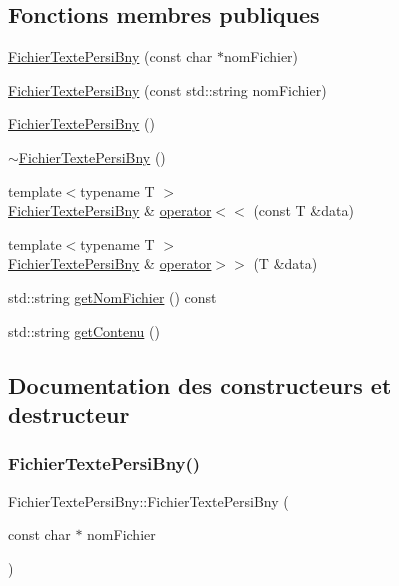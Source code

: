 \subsection*{Fonctions membres publiques}
\begin{DoxyCompactItemize}
\item 
\hyperlink{classFichierTextePersiBny_a6abeffa179773c3d7c00cf53a96019ad}{Fichier\+Texte\+Persi\+Bny} (const char $\ast$nom\+Fichier)
\item 
\hyperlink{classFichierTextePersiBny_a5106857b382a6a576be4f32af29e3b8f}{Fichier\+Texte\+Persi\+Bny} (const std\+::string nom\+Fichier)
\item 
\hyperlink{classFichierTextePersiBny_ac568130ed7a355bd74786f64fff587f2}{Fichier\+Texte\+Persi\+Bny} ()
\item 
\hyperlink{classFichierTextePersiBny_a1ee8d139d3e42d7bcc6b5853f25cb09b}{$\sim$\+Fichier\+Texte\+Persi\+Bny} ()
\item 
{\footnotesize template$<$typename T $>$ }\\\hyperlink{classFichierTextePersiBny}{Fichier\+Texte\+Persi\+Bny} \& \hyperlink{classFichierTextePersiBny_aec7709f80844eb19d021d9633dd6fc4c}{operator$<$$<$} (const T \&data)
\item 
{\footnotesize template$<$typename T $>$ }\\\hyperlink{classFichierTextePersiBny}{Fichier\+Texte\+Persi\+Bny} \& \hyperlink{classFichierTextePersiBny_a06cacad4ff051e5f4c0cec2590ea8132}{operator$>$$>$} (T \&data)
\item 
std\+::string \hyperlink{classFichierTextePersiBny_a290c72dd623b28361fa7a92d11f104e1}{get\+Nom\+Fichier} () const
\item 
std\+::string \hyperlink{classFichierTextePersiBny_aa82a4b555eca2b92c4ec1b1d3231d0c2}{get\+Contenu} ()
\end{DoxyCompactItemize}


\subsection{Documentation des constructeurs et destructeur}
\mbox{\label{classFichierTextePersiBny_a6abeffa179773c3d7c00cf53a96019ad}} 
\subsubsection{\texorpdfstring{Fichier\+Texte\+Persi\+Bny()}{FichierTextePersiBny()}\hspace{0.1cm}{\footnotesize\ttfamily [1/3]}}
{\footnotesize\ttfamily Fichier\+Texte\+Persi\+Bny\+::\+Fichier\+Texte\+Persi\+Bny (\begin{DoxyParamCaption}\item[{const char $\ast$}]{nom\+Fichier }\end{DoxyParamCaption})\hspace{0.3cm}{\ttfamily [inline]}}

